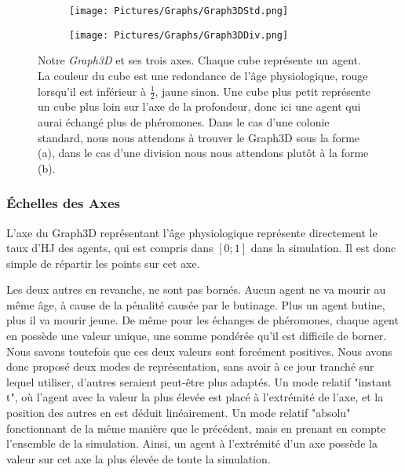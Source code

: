 	\begin{figure}
	\centering
	
	\begin{subfigure}{\textwidth}
	\centering
	\texttt{[image: Pictures/Graphs/Graph3DStd.png]}
	\caption{}
	\label{Graph3DStd}	
	\end{subfigure}
	
	\begin{subfigure}{\textwidth}
	\centering
	\texttt{[image: Pictures/Graphs/Graph3DDiv.png]}
	\caption{}
	\label{Graph3DDiv}
	\end{subfigure}
	
	\caption[Notre \textit{Graph3D} et ses trois axes.]{Notre \textit{Graph3D} et ses trois axes. Chaque cube représente un agent. La couleur du cube est une redondance de l'âge physiologique, rouge lorsqu'il est inférieur à $\frac{1}{2}$, jaune sinon. Une cube plus petit représente un cube plus loin sur l'axe de la profondeur, donc ici une agent qui aurai échangé plus de phéromones. Dans le cas d'une colonie standard, nous nous attendons à trouver le Graph3D sous la forme (a), dans le cas d'une division nous nous attendons plutôt à la forme (b).}	
	\label{Graph3D}
	\end{figure}
	
	\subsubsection{Échelles des Axes}
	L'axe du Graph3D représentant l'âge physiologique représente directement le taux d'HJ des agents, qui est compris dans $[0;1]$ dans la simulation. Il est donc simple de répartir les points sur cet axe.
	
	Les deux autres en revanche, ne sont pas bornés. Aucun agent ne va mourir au même âge, à cause de la pénalité causée par le butinage. Plus un agent butine, plus il va mourir jeune. De même pour les échanges de phéromones, chaque agent en possède une valeur unique, une somme pondérée qu'il est difficile de borner. Nous savons toutefois que ces deux valeurs sont forcément positives. Nous avons donc proposé deux modes de représentation, sans avoir à ce jour tranché sur lequel utiliser, d'autres seraient peut-être plus adaptés. Un mode relatif "instant t", où l'agent avec la valeur la plus élevée est placé à l'extrémité de l'axe, et la position des autres en est déduit linéairement. Un mode relatif "absolu" fonctionnant de la même manière que le précédent, mais en prenant en compte l'ensemble de la simulation. Ainsi, un agent à l'extrémité d'un axe possède la valeur sur cet axe la plus élevée de toute la simulation.
	
